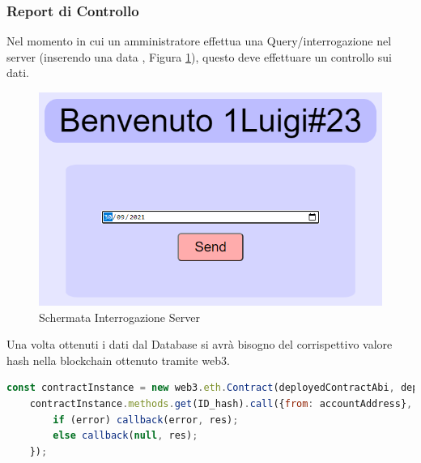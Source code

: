 \documentclass[11pt,a4paper,titlepage,twoside,openright]{report}
\begin{document}
\subsubsection{Report di Controllo}
Nel momento in cui un amministratore effettua una Query/interrogazione nel server (inserendo una data , Figura \ref{fig:Query}), questo deve effettuare un controllo sui dati.

\begin{figure}[h]
	\includegraphics[width=\textwidth]{Query}
	\centering
	\caption{Schermata Interrogazione Server}
	\label{fig:Query}
\end{figure}

Una volta ottenuti i dati dal Database si avrà bisogno del corrispettivo valore hash nella blockchain ottenuto tramite web3.
\begin{lstlisting}[language=JavaScript]
  	const contractInstance = new web3.eth.Contract(deployedContractAbi, deployedContractAddress);
 	contractInstance.methods.get(ID_hash).call({from: accountAddress}, (error, res) =>{
 	 	if (error) callback(error, res);
 	 	else callback(null, res);
 	});
\end{lstlisting}
\end{document}
